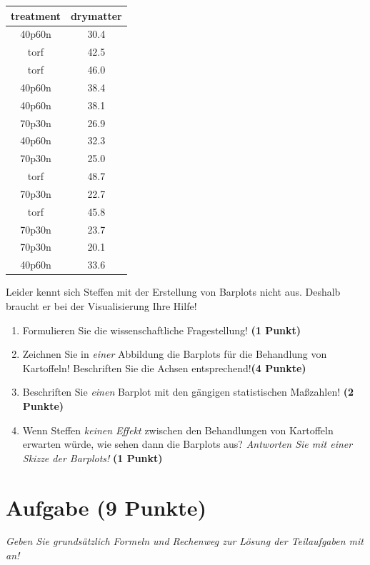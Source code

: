 \documentclass[a4paper, 9pt]{scrartcl}\usepackage[]{graphicx}\usepackage[]{xcolor}
\begin{document}
\begin{table}[!h]
\centering
\begin{tabular}{cc}
\toprule
treatment & drymatter\\
\midrule
40p60n & 30.4\\
torf & 42.5\\
torf & 46.0\\
40p60n & 38.4\\
40p60n & 38.1\\
\addlinespace
70p30n & 26.9\\
40p60n & 32.3\\
70p30n & 25.0\\
torf & 48.7\\
70p30n & 22.7\\
\addlinespace
torf & 45.8\\
70p30n & 23.7\\
70p30n & 20.1\\
40p60n & 33.6\\
\bottomrule
\end{tabular}
\end{table}



Leider kennt sich Steffen mit der Erstellung von Barplots nicht aus. Deshalb braucht er bei der Visualisierung Ihre Hilfe!

\begin{enumerate}
\item Formulieren Sie die wissenschaftliche Fragestellung! \textbf{(1 Punkt)}
\item Zeichnen Sie in \textit{einer} Abbildung die Barplots für die Behandlung von Kartoffeln! Beschriften Sie die Achsen entsprechend!\textbf{(4 Punkte)}
\item Beschriften Sie \textit{einen} Barplot mit den gängigen statistischen Maßzahlen! \textbf{(2 Punkte)}
\item Wenn Steffen \textit{keinen Effekt} zwischen den Behandlungen von Kartoffeln erwarten würde, wie sehen dann die Barplots aus? \textit{Antworten Sie mit einer Skizze der Barplots!}
  \textbf{(1 Punkt)}
\end{enumerate} 
\clearpage

\section{Aufgabe \hfill (9 Punkte)}

\textit{Geben Sie grundsätzlich Formeln und Rechenweg zur Lösung der Teilaufgaben mit an!} \\[1Ex]
 
\end{document}
